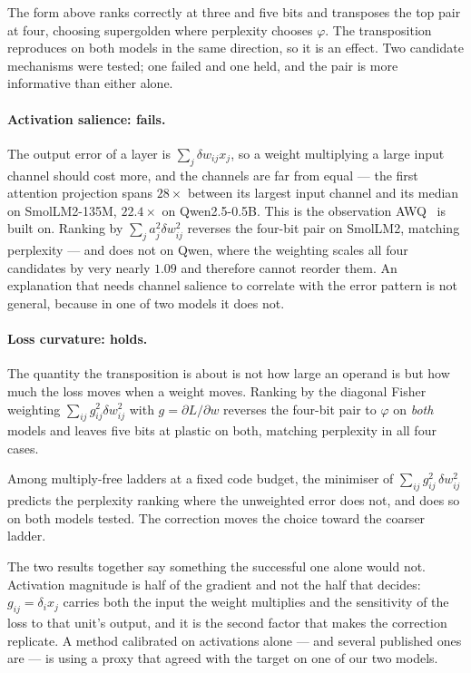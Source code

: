 The form above ranks correctly at three and five bits and transposes the top
pair at four, choosing supergolden where perplexity chooses $\varphi$. The
transposition reproduces on both models in the same direction, so it is an
effect. Two candidate mechanisms were tested; one failed and one held, and the
pair is more informative than either alone.

\paragraph{Activation salience: fails.} The output error of a layer is
$\sum_j \delta w_{ij}x_j$, so a weight multiplying a large input channel should
cost more, and the channels are far from equal --- the first attention
projection spans $28\times$ between its largest input channel and its median on
SmolLM2-135M, $22.4\times$ on Qwen2.5-0.5B. This is the observation
AWQ~\cite{awq} is built on. Ranking by $\sum_j a_j^{2}\delta w_{ij}^{2}$
reverses the four-bit pair on SmolLM2, matching perplexity --- and does not on
Qwen, where the weighting scales all four candidates by very nearly $1.09$ and
therefore cannot reorder them. An explanation that needs channel salience to
correlate with the error pattern is not general, because in one of two models it
does not.

\paragraph{Loss curvature: holds.} The quantity the transposition is about is
not how large an operand is but how much the loss moves when a weight moves.
Ranking by the diagonal Fisher weighting $\sum_{ij} g_{ij}^{2}\delta w_{ij}^{2}$
with $g=\partial L/\partial w$ reverses the four-bit pair to $\varphi$ on
\emph{both} models and leaves five bits at plastic on both, matching perplexity
in all four cases.

\begin{theorem}\label{thm:curvature}
Among multiply-free ladders at a fixed code budget, the minimiser of
$\sum_{ij} g_{ij}^{2}\,\delta w_{ij}^{2}$ predicts the perplexity ranking where
the unweighted error does not, and does so on both models tested. The correction
moves the choice toward the coarser ladder.
\end{theorem}

The two results together say something the successful one alone would not.
Activation magnitude is half of the gradient and not the half that decides:
$g_{ij} = \delta_i x_j$ carries both the input the weight multiplies and the
sensitivity of the loss to that unit's output, and it is the second factor that
makes the correction replicate. A method calibrated on activations alone --- and
several published ones are --- is using a proxy that agreed with the target on
one of our two models.

